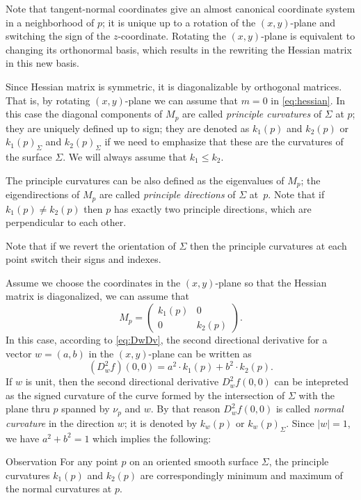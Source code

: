 Note that tangent-normal coordinates give an almost canonical coordinate system in a neighborhood of $p$;
it is unique up to a rotation of  the $(x,y)$-plane and switching the sign of the $z$-coordinate.
Rotating the $(x,y)$-plane is equivalent to changing its orthonormal basis, which results in the rewriting   
the Hessian matrix in this new basis.

Since Hessian matrix is symmetric, it is diagonalizable by orthogonal matrices. %
That is, by rotating $(x,y)$-plane we can assume that $m=0$ in \ref{eq:hessian}. %
In this case the diagonal components of $M_p$ are called \emph{principle curvatures} of $\Sigma$ at $p$;
they are uniquely defined up to sign;
they are denoted as $k_1(p)$ and $k_2(p)$ or $k_1(p)_\Sigma$ and $k_2(p)_\Sigma$ if we need to emphasize that these are the curvatures of the surface $\Sigma$.
We will always assume that $k_1\le k_2$.

The principle curvatures can be also defined as the eigenvalues of $M_p$;
the eigendirections of $M_p$ are called \emph{principle directions} of $\Sigma$ at~$p$.
Note that if $k_1(p)\ne k_2(p)$ then $p$ has exactly two principle directions, which are perpendicular to each other.

Note that if we revert the orientation of $\Sigma$ then the principle curvatures at each point switch their signs and indexes.

Assume we choose the coordinates in the $(x,y)$-plane so that the Hessian matrix is diagonalized, we can assume that
\[M_p=\begin{pmatrix}
   k_1(p)
   &0
   \\
   0
   &k_2(p)
  \end{pmatrix}.
\]
In this case, according to \ref{eq:DwDv}, the second directional derivative
for a vector $w=(a,b)$ in the $(x,y)$-plane can be written as 
\[
(D^2_wf)(0,0)=a^2\cdot k_1(p) +b^2\cdot k_2(p).
\]
If $w$ is unit, then the second directional derivative $D^2_wf(0,0)$ can be intepreted as the signed curvature of the curve formed by the intersection of $\Sigma$ with the plane thru $p$ spanned by $\nu_p$ and $w$.
By that reason $D^2_wf(0,0)$ is called \emph{normal curvature} in the direction $w$;
it is denoted by $k_w(p)$ or $k_w(p)_\Sigma$.
Since $|w|=1$, we have $a^2+b^2=1$ which implies the following:

\begin{thm}{Observation}\label{obs:k1-k2}
For any point $p$ on an oriented smooth surface $\Sigma$,
the principle curvatures $k_1(p)$ and $k_2(p)$ are correspondingly minimum and maximum of the normal curvatures at $p$.
\end{thm}

